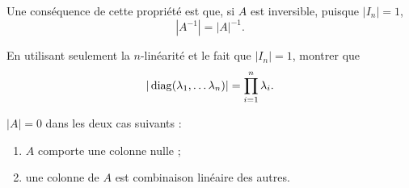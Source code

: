 \remark Une conséquence de cette propriété est que, si $A$ est inversible, puisque $|I_n| = 1$,
$$
|A^{-1}| = |A|^{-1}.
$$

\begin{exercise*}
  En utilisant seulement la $n$-linéarité et le fait que $|I_n| = 1$, montrer que 
  $$
  |\operatorname{diag}(\lambda_1, \dots \lambda_n)| = \prod_{i = 1}^n \lambda_i.
  $$
\end{exercise*}


\begin{lemma*}
  $|A| = 0$ dans les deux cas suivants :
  \begin{enumerate}[($i$)] 
  \item $A$ comporte une colonne nulle ;
  \item une colonne de $A$ est combinaison linéaire des autres.
  \end{enumerate}
\end{lemma*}

